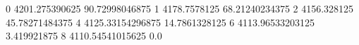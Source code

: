 0 4201.275390625 90.72998046875
1 4178.7578125 68.21240234375
2 4156.328125 45.78271484375
4 4125.33154296875 14.7861328125
6 4113.96533203125 3.419921875
8 4110.54541015625 0.0
